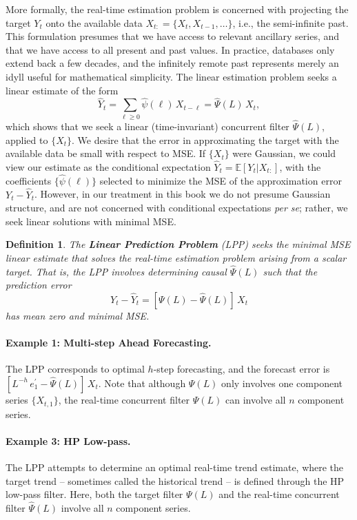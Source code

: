 \documentclass[a4paper]{book}
\def\EE{\mathbb E}
\newtheorem{Definition}{Definition}
\begin{document}
More formally, the real-time estimation problem is concerned with
projecting the target $Y_t$ onto the available data $X_{t:} = \{ X_t, X_{t-1},
\ldots \}$, i.e., the semi-infinite past.  This formulation presumes that
 we have access to relevant ancillary series, and that we have access to all
 present and past values.  In practice, databases only extend back a few decades,
 and the infinitely remote past represents merely an idyll useful for 
 mathematical simplicity.  The linear estimation problem seeks a linear estimate
  of the form
\[
   \widehat{Y}_t = \sum_{\ell \geq 0} \widehat{\psi} (\ell) \, X_{t-\ell}
     = \widehat{\Psi} (L) \, X_t,
\]
 which shows that we seek a linear
(time-invariant) concurrent filter $\widehat{\Psi} (L)$, applied to $\{ X_t \}$. 
 We desire that the
error in approximating the target with the available data be small with respect to MSE.
 If $\{ X_t \}$ were Gaussian, we could view our estimate as the conditional
expectation $\widehat{Y}_t = \EE [ Y_t \vert X_{t : } ]$, with the coefficients
$\{ \widehat{\psi} (\ell) \}$ selected to minimize the MSE
  of the approximation error $Y_t - \widehat{Y}_t$.  However, in our treatment in this book
 we do not presume Gaussian structure, and are not concerned with conditional expectations
 {\em per se}; rather, we seek linear solutions with minimal MSE.  
 

\begin{Definition} \rm
 The {\bf Linear Prediction Problem} (LPP) seeks the minimal
 MSE linear estimate that solves the real-time estimation problem
  arising from a scalar target.  That
 is, the LPP involves determining causal $\widehat{\Psi} (L)$ such that the
 prediction error
\[
 Y_t - \widehat{Y}_t = \left[ \Psi (L) - \widehat{\Psi} (L) \right] \, X_t
\]
 has mean zero and minimal MSE.
\end{Definition}

\paragraph{Example 1: Multi-step Ahead Forecasting.}   The LPP corresponds to
  optimal $h$-step
 forecasting, and the forecast error is $[L^{-h} \, e_1^{\prime} - \widehat{\Psi} (L) ] \, X_t$.
  Note that although $\Psi (L)$ only involves one component series $\{ X_{t,1} \}$,
  the real-time concurrent filter $\widehat{\Psi} (L)$ can involve all $n$ component series.

\paragraph{Example 3: HP Low-pass.}  
  The LPP attempts to determine an optimal real-time trend estimate, where the target trend
 -- sometimes called the historical trend -- is defined through the HP low-pass filter.
  Here, both the target filter $\Psi (L)$ and the real-time 
   concurrent filter $\widehat{\Psi} (L)$   involve all $n$ component series.
\end{document}
